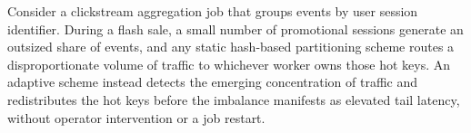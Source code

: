 \documentclass[10pt,twocolumn]{article}
\begin{document}
\pagestyle{empty}

Consider a clickstream aggregation job that groups events by user session
identifier. During a flash sale, a small number of promotional sessions
generate an outsized share of events, and any static hash-based partitioning
scheme routes a disproportionate volume of traffic to whichever worker owns
those hot keys. An adaptive scheme instead detects the emerging
concentration of traffic and redistributes the hot keys before the
imbalance manifests as elevated tail latency, without operator
intervention or a job restart.
\end{document}
